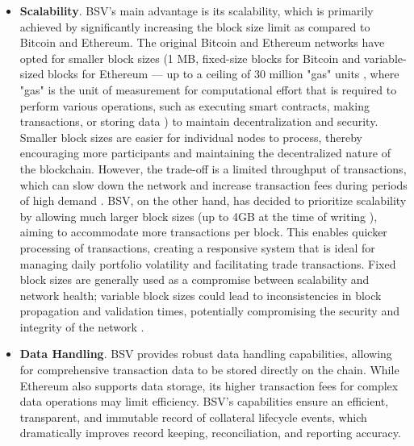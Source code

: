 \begin{itemize}
    \item \label{item:scalability} \textbf{Scalability}. BSV's main advantage is its scalability, which is primarily achieved by significantly increasing the block size limit as compared to Bitcoin and Ethereum. The original Bitcoin and Ethereum networks have opted for smaller block sizes (1 MB, fixed-size blocks for Bitcoin \citep{btc_block_size_limit} and variable-sized blocks for Ethereum --- up to a ceiling of 30 million "gas" units \citep{eth_block_size}, where "gas" is the unit of measurement for computational effort that is required to perform various operations, such as executing smart contracts, making transactions, or storing data \citep{eth_gas}) to maintain decentralization and security. Smaller block sizes are easier for individual nodes to process, thereby encouraging more participants and maintaining the decentralized nature of the blockchain. However, the trade-off is a limited throughput of transactions, which can slow down the network and increase transaction fees during periods of high demand \citep{singh2020computing}. BSV, on the other hand, has decided to prioritize scalability by allowing much larger block sizes (up to 4GB at the time of writing \citep{bsv_block_size}), aiming to accommodate more transactions per block. This enables quicker processing of transactions, creating a responsive system that is ideal for managing daily portfolio volatility and facilitating trade transactions. Fixed block sizes are generally used as a compromise between scalability and network health; variable block sizes could lead to inconsistencies in block propagation and validation times, potentially compromising the security and integrity of the network \citep{singh2020computing}.

    \item \textbf{Data Handling}. BSV provides robust data handling capabilities, allowing for comprehensive transaction data to be stored directly on the chain. While Ethereum also supports data storage, its higher transaction fees for complex data operations may limit efficiency. BSV's capabilities ensure an efficient, transparent, and immutable record of collateral lifecycle events, which dramatically improves record keeping, reconciliation, and reporting accuracy.
    

\end{itemize}

